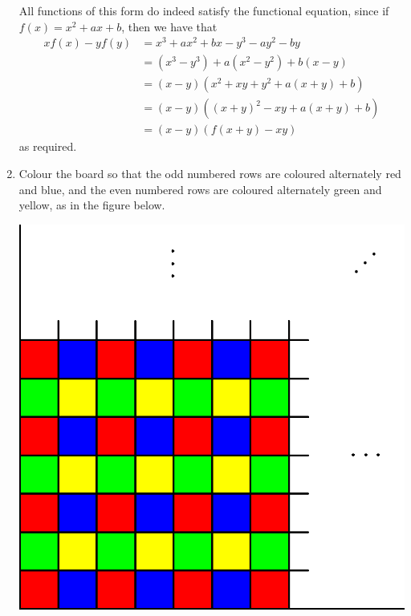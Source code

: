 \documentclass[12pt]{article}
\begin{document}
\begin{enumerate}
All functions of this form do indeed satisfy the functional equation, since if
$f(x) = x^2 + ax + b$, then we have that
\begin{align*}
    xf(x) - yf(y) & = x^3 + ax^2 + bx - y^3 - ay^2 - by \\
    & = (x^3 - y^3) + a(x^2 - y^2) + b(x - y) \\
    & = (x - y)(x^2 + xy + y^2 + a(x + y) + b) \\
    & = (x - y)((x + y)^2 - xy + a(x + y) + b) \\
    & = (x - y)(f(x + y) - xy)
\end{align*}
as required.


\item %

Colour the board so that the odd numbered rows are coloured alternately red
and blue, and the even numbered rows are coloured alternately green and yellow,
as in the figure below.

\begin{center}
    \includegraphics{january_q4.eps}
\end{center}


\end{enumerate}
\end{document}
